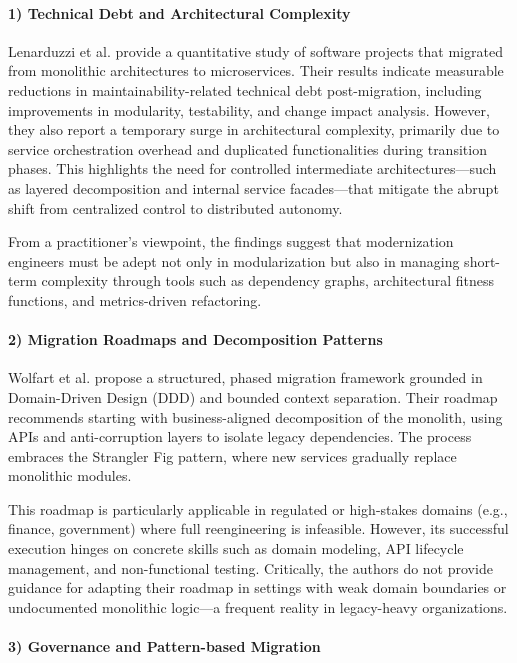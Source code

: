 \documentclass[12pt]{article}
\begin{document}
\paragraph{1) Technical Debt and Architectural Complexity}

Lenarduzzi et al. \cite{lenarduzzi2020} provide a quantitative study of software projects that migrated from monolithic architectures to microservices. Their results indicate measurable reductions in maintainability-related technical debt post-migration, including improvements in modularity, testability, and change impact analysis. However, they also report a temporary surge in architectural complexity, primarily due to service orchestration overhead and duplicated functionalities during transition phases. This highlights the need for controlled intermediate architectures—such as layered decomposition and internal service facades—that mitigate the abrupt shift from centralized control to distributed autonomy.

From a practitioner's viewpoint, the findings suggest that modernization engineers must be adept not only in modularization but also in managing short-term complexity through tools such as dependency graphs, architectural fitness functions, and metrics-driven refactoring.

\paragraph{2) Migration Roadmaps and Decomposition Patterns}

Wolfart et al. \cite{wolfart2021} propose a structured, phased migration framework grounded in Domain-Driven Design (DDD) and bounded context separation. Their roadmap recommends starting with business-aligned decomposition of the monolith, using APIs and anti-corruption layers to isolate legacy dependencies. The process embraces the Strangler Fig pattern, where new services gradually replace monolithic modules.

This roadmap is particularly applicable in regulated or high-stakes domains (e.g., finance, government) where full reengineering is infeasible. However, its successful execution hinges on concrete skills such as domain modeling, API lifecycle management, and non-functional testing. Critically, the authors do not provide guidance for adapting their roadmap in settings with weak domain boundaries or undocumented monolithic logic—a frequent reality in legacy-heavy organizations.

\paragraph{3) Governance and Pattern-based Migration}
\end{document}
